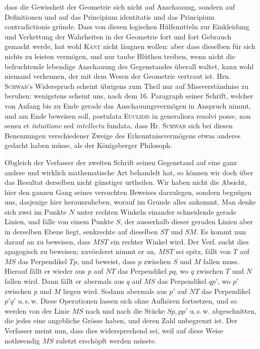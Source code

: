 %
dass die Gewissheit der Geometrie sich nicht auf Anschauung, sondern auf Definitionen und auf das Principium identitatis und das Principium contradictionis gründe. Dass von diesen logischen Hülfsmitteln zur Einkleidung und Verkettung der Wahrheiten in der Geometrie fort und fort Gebrauch gemacht werde, hat wohl \textsc{Kant} nicht läugnen wollen: aber dass dieselben für sich nichts zu leisten vermögen, und nur taube Blüthen treiben, wenn nicht die befruchtende lebendige Anschauung des Gegenstandes überall waltet, kann wohl niemand verkennen, der mit dem Wesen der Geometrie vertraut ist. Hrn. \textsc{Schwab}'s Widerspruch scheint übrigens zum Theil nur auf Missverständniss zu beruhen: wenigstens scheint uns, nach dem 16. Paragraph seiner Schrift, welcher von Anfang bis zu Ende gerade das Anschauungsvermögen in Anspruch nimmt, und am Ende beweisen soll, postulata \textsc{Euclidis} in generaliora resolvi posse, non sensu et \textit{intuitione} sed \textit{intellectu} fundata, dass Hr. \textsc{Schwab} sich bei diesen Benennungen verschiedener Zweige des Erkenntnissvermögens etwas anderes gedacht haben müsse, als der Königsberger Philosoph.

Obgleich der Verfasser der zweiten Schrift seinen Gegenstand auf eine ganz andere und wirklich mathematische Art behandelt hat, so können wir doch über das Resultat derselben nicht günstiger urtheilen. Wir haben nicht die Absicht, hier den ganzen Gang seines versuchten Beweises darzulegen, sondern begnügen uns, dasjenige hier herauszuheben, worauf im Grunde alles ankommt. Man denke sich zwei im Punkte \(N\) unter rechten Winkeln einander schneidende gerade Linien, und fälle von einem Punkte \(S\), der ausserhalb dieser geraden Linien aber in derselben Ebene liegt, senkrechte auf dieselben \(ST\) und \(SM\). Es kommt nun darauf an zu beweisen, dass \(MST\) ein rechter Winkel wird. Der Verf. sucht dies apagogisch zu beweisen; zuvörderst nimmt er an, \(MST\) sei spitz, fällt von \(T\) auf \(MS\) das Perpendikel \(Tp\), und beweist, dass \(p\) zwischen \(S\) und \(M\) fallen muss. Hierauf fällt er wieder aus \(p\) auf \(NT\) das Perpendikel \(pq\), wo \(q\) zwischen \(T\) und \(N\) fallen wird. Dann fällt er abermals aus \(q\) auf \(MS\) das Perpendikel \(qp'\), wo \(p'\) zwischen \(p\) und \(M\) liegen wird. Sodann abermals aus \(p'\) auf \(NT\) das Perpendikel \(p'q'\) u.\,s.\,w. Diese Operationen lassen sich ohne Aufhören fortsetzen, und so werden von der Linie \(MS\) nach und nach die Stücke \(Sp,pp'\) u.\,s.\,w. abgeschnitten, die jedes eine angebliche Grösse haben, und deren Zahl unbegrenzt ist. Der Verfasser meint nun, dass dies widersprechend sei, weil auf diese Weise nothwendig \(MS\) zuletzt erschöpft werden müsste.
